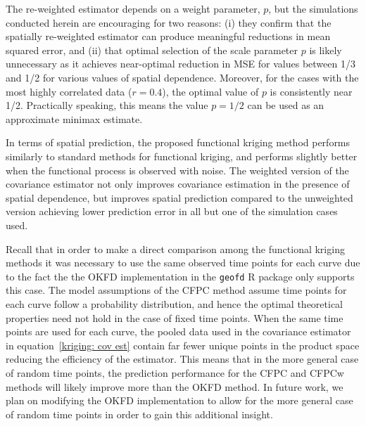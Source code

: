 The re-weighted estimator depends on a weight parameter, $p$, but the simulations conducted herein are encouraging for two reasons: (i) they confirm that the spatially re-weighted estimator can produce meaningful reductions in mean squared error, and (ii) that optimal selection of the scale parameter $p$ is likely unnecessary as it achieves near-optimal reduction in MSE for values between 1/3 and 1/2 for various values of spatial dependence. Moreover, for the cases with the most highly correlated data ($r = 0.4$), the optimal value of $p$ is consistently near 1/2. Practically speaking, this means the value $p = 1/2$ can be used as an approximate minimax estimate. 

In terms of spatial prediction, the proposed functional kriging method performs similarly to standard methods for functional kriging, and performs slightly better when the functional process is observed with noise. The weighted version of the covariance estimator not only improves covariance estimation in the presence of spatial dependence, but improves spatial prediction compared to the unweighted version achieving lower prediction error in all but one of the simulation cases used. 

Recall that in order to make a direct comparison among the functional kriging methods it was necessary to use the same observed time points for each curve due to the fact the the OKFD implementation in the \texttt{geofd} R package only supports this case. The model assumptions of the CFPC method assume time points for each curve follow a probability distribution, and hence the optimal theoretical properties need not hold in the case of fixed time points. When the same time points are used for each curve, the pooled data used in the covariance estimator in equation~\eqref{kriging: cov est} contain far fewer unique points in the product space reducing the efficiency of the estimator. This means that in the more general case of random time points, the prediction performance for the CFPC and CFPCw methods will likely improve more than the OKFD method. In future work, we plan on modifying the OKFD implementation to allow for the more general case of random time points in order to gain this additional insight. 

